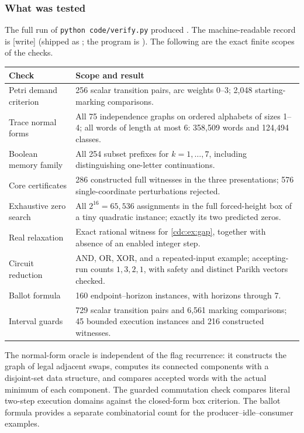 \documentclass[11pt,a4paper]{article}
\theoremstyle{definition}
\theoremstyle{remark}
\newcommand{\code}[1]{\texttt{\detokenize{#1}}}
\newcommand{\wtag}{\textup{[write]}}%
\begin{document}
\subsubsection{What was tested}
The full run of \texttt{python code/verify.py} produced \code{PASS}. The machine-readable record is \code{results/verification.json} \wtag{} (shipped as ; the program is ). The following are the exact finite scopes of the checks.
\begin{center}
\small
\begin{tabularx}{\textwidth}{@{}p{}X@{}}
\toprule
Check & Scope and result\\
\midrule
Petri demand criterion & 256 scalar transition pairs, arc weights $0$--$3$; 2,048 starting-marking comparisons.\\
Trace normal forms & All 75 independence graphs on ordered alphabets of sizes 1--4; all words of length at most 6: 358,509 words and 124,494 classes.\\
Boolean memory family & All 254 subset prefixes for $k=1,\ldots,7$, including distinguishing one-letter continuations.\\
Core certificates & 286 constructed full witnesses in the three presentations; 576 single-coordinate perturbations rejected.\\
Exhaustive zero search & All $2^{16}=65,536$ assignments in the full forced-height box of a tiny quadratic instance; exactly its two predicted zeros.\\
Real relaxation & Exact rational witness for \cref{cdc:ex:gap}, together with absence of an enabled integer step.\\
Circuit reduction & AND, OR, XOR, and a repeated-input example; accepting-run counts $1,3,2,1$, with safety and distinct Parikh vectors checked.\\
Ballot formula & 160 endpoint--horizon instances, with horizons through 7.\\
Interval guards & 729 scalar transition pairs and 6,561 marking comparisons; 45 bounded execution instances and 216 constructed witnesses.\\
\bottomrule
\end{tabularx}
\end{center}

The normal-form oracle is independent of the flag recurrence: it constructs the graph of legal adjacent swaps, computes its connected components with a disjoint-set data structure, and compares accepted words with the actual minimum of each component. The guarded commutation check compares literal two-step execution domains against the closed-form box criterion. The ballot formula provides a separate combinatorial count for the producer--idle--consumer examples.
\end{document}
